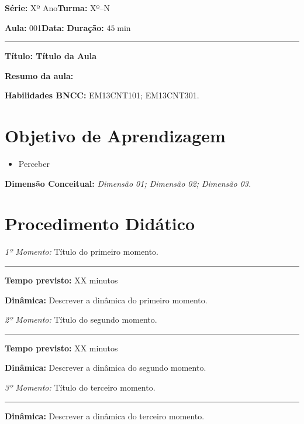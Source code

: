 \documentclass[
12pt,				%
openright,			%
oneside,			%
a4paper,			%
chapter=TITLE,		%
english,			%
brazil				%
]{abntex2}
\begin{document}
\par\noindent\textbf{Série:} Xº Ano\hfill{}\textbf{Turma:} Xº--N
\par\noindent\textbf{Aula:} 001\hfill{}\textbf{Data:} \mydate\hfill{}\textbf{Duração:} $45\min$
\rule{\textwidth}{.5pt}
\bigskip{}  
\noindent
\begin{center}
	\textbf{Título: Título da Aula}
\end{center}
\par\noindent\textbf{Resumo da aula: }
\par\noindent\textbf{Habilidades BNCC: }EM13CNT101; EM13CNT301.

\section{Objetivo de Aprendizagem}
\begin{itemize}
	\item Perceber
\end{itemize}

\medskip{}

\noindent\textbf{Dimensão Conceitual:} \emph{Dimensão 01; Dimensão 02; Dimensão 03.}
\newpage

\section{Procedimento Didático} 
\noindent\emph{1º Momento:} Título do primeiro momento.
\par\noindent\rule{.3\textwidth}{.5pt}  
\par\noindent\textbf{Tempo previsto:} XX minutos

\noindent\textbf{Dinâmica:} Descrever a dinâmica do primeiro momento.

\vspace{50pt}
\noindent\emph{2º Momento:} Título do segundo momento.
\par\noindent\rule{.3\textwidth}{.5pt}    
\par\noindent\textbf{Tempo previsto: }XX minutos


\noindent\textbf{Dinâmica:} Descrever a dinâmica do segundo momento.

\vspace{50pt}
\noindent\emph{3º Momento:} Título do terceiro momento.
\par\noindent\rule{.3\textwidth}{.5pt}
\par\noindent\textbf{Dinâmica:} Descrever a dinâmica do terceiro momento.
% 
\end{document}
